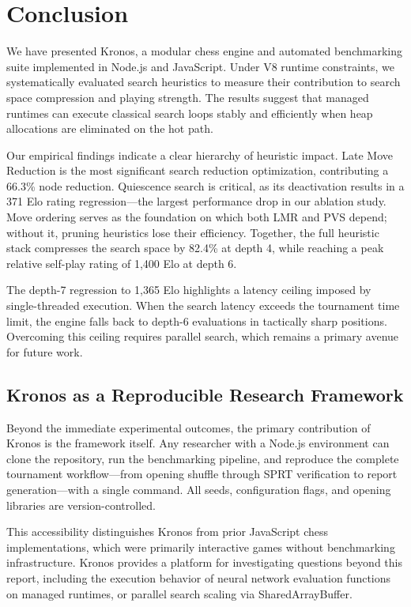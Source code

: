 \chapter{Conclusion}
\label{ch:conclusion}

We have presented Kronos, a modular chess engine and automated benchmarking suite implemented in Node.js and JavaScript. Under V8 runtime constraints, we systematically evaluated search heuristics to measure their contribution to search space compression and playing strength. The results suggest that managed runtimes can execute classical search loops stably and efficiently when heap allocations are eliminated on the hot path.

Our empirical findings indicate a clear hierarchy of heuristic impact. Late Move Reduction is the most significant search reduction optimization, contributing a 66.3\% node reduction. Quiescence search is critical, as its deactivation results in a 371 Elo rating regression—the largest performance drop in our ablation study. Move ordering serves as the foundation on which both LMR and PVS depend; without it, pruning heuristics lose their efficiency. Together, the full heuristic stack compresses the search space by 82.4\% at depth 4, while reaching a peak relative self-play rating of 1,400 Elo at depth 6.


The depth-7 regression to 1,365 Elo highlights a latency ceiling imposed by single-threaded execution. When the search latency exceeds the tournament time limit, the engine falls back to depth-6 evaluations in tactically sharp positions. Overcoming this ceiling requires parallel search, which remains a primary avenue for future work.

\section{Kronos as a Reproducible Research Framework}
Beyond the immediate experimental outcomes, the primary contribution of Kronos is the framework itself. Any researcher with a Node.js environment can clone the repository, run the benchmarking pipeline, and reproduce the complete tournament workflow—from opening shuffle through SPRT verification to report generation—with a single command. All seeds, configuration flags, and opening libraries are version-controlled.

This accessibility distinguishes Kronos from prior JavaScript chess implementations, which were primarily interactive games without benchmarking infrastructure. Kronos provides a platform for investigating questions beyond this report, including the execution behavior of neural network evaluation functions on managed runtimes, or parallel search scaling via SharedArrayBuffer.

